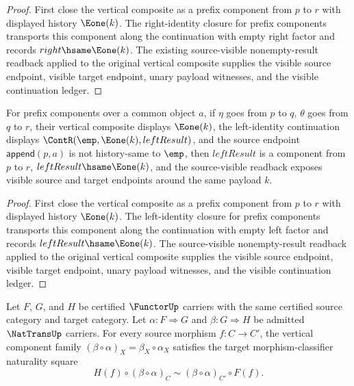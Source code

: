 \begin{proof}
First close the vertical composite as a prefix component from $p$ to $r$ with
displayed history $\Eone(k)$. The right-identity closure for prefix components
transports this component along the continuation with empty right factor and
records $right\hsame\Eone(k)$. The existing source-visible nonempty-result
readback applied to the original vertical composite supplies the visible
source endpoint, visible target endpoint, unary payload witnesses, and the
visible continuation ledger.
\end{proof}
\begin{theorem}
\label{thm:nattrans-prefix-component-carrier-vert-comp-nonempty-result-left-identity-visible-readback}
For prefix components over a common object $a$, if $\eta$ goes from $p$ to
$q$, $\theta$ goes from $q$ to $r$, their vertical composite displays
$\Eone(k)$, the left-identity continuation displays
$\ContR(\emp,\Eone(k),leftResult)$, and the source endpoint
$\mathsf{append}(p,a)$ is not history-same to $\emp$, then $leftResult$ is a
component from $p$ to $r$, $leftResult\hsame\Eone(k)$, and the source-visible
readback exposes visible source and target endpoints around the same payload
$k$.
\end{theorem}
\begin{proof}
First close the vertical composite as a prefix component from $p$ to $r$ with
displayed history $\Eone(k)$. The left-identity closure for prefix components
transports this component along the continuation with empty left factor and
records $leftResult\hsame\Eone(k)$. The source-visible nonempty-result
readback applied to the original vertical composite supplies the visible
source endpoint, visible target endpoint, unary payload witnesses, and the
visible continuation ledger.
\end{proof}
\begin{theorem}
\label{thm:nattrans-vertical-composition-naturality}
Let \(F\), \(G\), and \(H\) be certified \(\FunctorUp\) carriers with the same certified source category and target category. Let \(\alpha:F\Rightarrow G\) and \(\beta:G\Rightarrow H\) be admitted \(\NatTransUp\) carriers. For every source morphism \(f:C\to C'\), the vertical component family \((\beta\circ\alpha)_X=\beta_X\circ\alpha_X\) satisfies the target morphism-classifier naturality square
$$
  H(f)\circ(\beta\circ\alpha)_C
  \sim
  (\beta\circ\alpha)_{C'}\circ F(f).
$$
\end{theorem}
